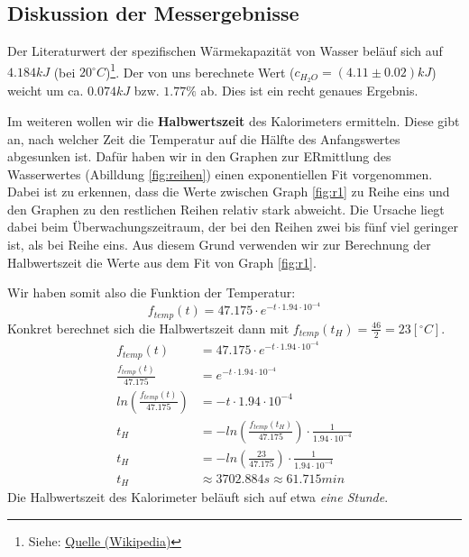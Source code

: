 \documentclass[10pt,a4paper]{article}
\begin{document}
\subsection{Diskussion der Messergebnisse}
\begin{flushleft}
Der Literaturwert der spezifischen Wärmekapazität von Wasser beläuf sich auf $4.184 kJ$ (bei $20^{\circ}C$)\footnote{Siehe: \href{https://de.wikipedia.org/wiki/Spezifische_W\%C3\%A4rmekapazit\%C3\%A4t}{Quelle (Wikipedia)}}. Der von uns berechnete Wert ($c_{H_2O} = (4.11 \pm 0.02)kJ$) weicht um ca. $0.074 kJ$ bzw. $1.77\%$ ab. Dies ist ein recht genaues Ergebnis.
\end{flushleft}
\begin{flushleft}
Im weiteren wollen wir die \textbf{Halbwertszeit} des Kalorimeters ermitteln. Diese gibt an, nach welcher Zeit die Temperatur auf die Hälfte des Anfangswertes abgesunken ist. Dafür haben wir in den Graphen zur ERmittlung des Wasserwertes (Abilldung \ref{fig:reihen}) einen exponentiellen Fit vorgenommen. Dabei ist zu erkennen, dass die Werte zwischen Graph \ref{fig:r1} zu Reihe eins und den Graphen zu den restlichen Reihen relativ stark abweicht. Die Ursache liegt dabei beim Überwachungszeitraum, der bei den Reihen zwei bis fünf viel geringer ist, als bei Reihe eins. Aus diesem Grund verwenden wir zur Berechnung der Halbwertszeit die Werte aus dem Fit von Graph \ref{fig:r1}.

Wir haben somit also die Funktion der Temperatur:
\begin{equation}\label{eq:expotemp}
f_{temp}(t) = 47.175 \cdot e^{-t \cdot 1.94 \cdot 10^{-4}}
\end{equation}
Konkret berechnet sich die Halbwertszeit dann mit $f_{temp}(t_H) = \frac{46}{2} = 23 [^{\circ}C]$.
\begin{align*}
f_{temp}(t) &= 47.175 \cdot e^{-t \cdot 1.94 \cdot 10^{-4}} \\
\frac{f_{temp}(t)}{47.175} &= e^{-t \cdot 1.94 \cdot 10^{-4}} \\
ln \left( \frac{f_{temp}(t)}{47.175} \right) &= -t \cdot 1.94 \cdot 10^{-4} \\
t_H &= - ln \left( \frac{f_{temp}(t_H)}{47.175} \right) \cdot \frac{1}{1.94 \cdot 10^{-4}} \\
t_H &= - ln \left( \frac{23}{47.175} \right) \cdot \frac{1}{1.94 \cdot 10^{-4}} \\
t_H &\approx 3702.884 s \approx 61.715 min
\end{align*}
Die Halbwertszeit des Kalorimeter beläuft sich auf etwa \textit{eine Stunde}.
\end{flushleft}
\end{document}
